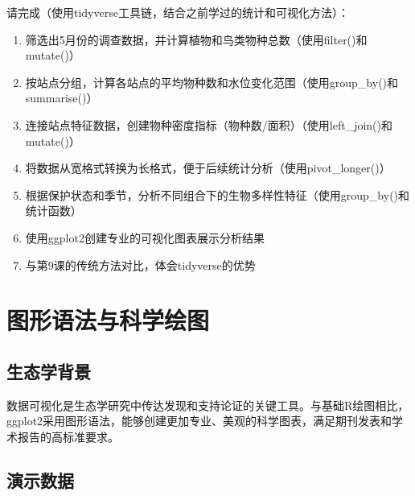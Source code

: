 \documentclass[
  twoside]{book}
\begin{document}
请完成（使用tidyverse工具链，结合之前学过的统计和可视化方法）：

\begin{enumerate}
\def\labelenumi{\arabic{enumi}.}
\item
  筛选出5月份的调查数据，并计算植物和鸟类物种总数（使用filter()和mutate()）
\item
  按站点分组，计算各站点的平均物种数和水位变化范围（使用group\_by()和summarise()）
\item
  连接站点特征数据，创建物种密度指标（物种数/面积）（使用left\_join()和mutate()）
\item
  将数据从宽格式转换为长格式，便于后续统计分析（使用pivot\_longer()）
\item
  根据保护状态和季节，分析不同组合下的生物多样性特征（使用group\_by()和统计函数）
\item
  使用ggplot2创建专业的可视化图表展示分析结果
\item
  与第9课的传统方法对比，体会tidyverse的优势
\end{enumerate}

\hypertarget{ux56feux5f62ux8bedux6cd5ux4e0eux79d1ux5b66ux7ed8ux56fe}{%
\section{图形语法与科学绘图}\label{ux56feux5f62ux8bedux6cd5ux4e0eux79d1ux5b66ux7ed8ux56fe}}

\hypertarget{ux751fux6001ux5b66ux80ccux666f-9}{%
\subsection{生态学背景}\label{ux751fux6001ux5b66ux80ccux666f-9}}

数据可视化是生态学研究中传达发现和支持论证的关键工具。与基础R绘图相比，ggplot2采用图形语法，能够创建更加专业、美观的科学图表，满足期刊发表和学术报告的高标准要求。

\hypertarget{ux6f14ux793aux6570ux636e-8}{%
\subsection{演示数据}\label{ux6f14ux793aux6570ux636e-8}}
\end{document}
